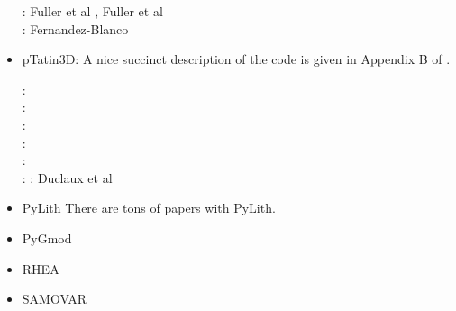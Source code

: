 \begin{itemize}
\begin{scriptsize}
\twothousandsix: Fuller et al \cite{fuwb06}, Fuller et al \cite{fuwf06}\\
\twothousandtwenty: Fernandez-Blanco \cite{femb20}
\end{scriptsize}

\item pTatin3D: A nice succinct description of the code is given in Appendix B of \cite{lemh17}. 

\begin{scriptsize}
\twothousandthirteen: \cite{phil13}\\
\twothousandfourteen: \cite{mabl14}\\
\twothousandfifteen: \cite{mabl15}\\
\twothousandseventeen: \cite{lemh17}\cite{magm17}\\
\twothousandeighteen: \cite{jolp18}\\
\twothousandnineteen: \cite{jolm19}
\twothousandtwenty: Duclaux et al \cite{duhm20}
\end{scriptsize}

\item PyLith 
There are tons of papers with PyLith. 

{\small
\noindent
\cite{aakw13}
}

\item PyGmod 

{\small
\noindent
\cite{crvs15}
}


\item RHEA 

{\small
\noindent
\cite{bugg08}
\cite{stgb10}
\cite{algs12}
\cite{busa13}
}

\item SAMOVAR


\end{itemize}
